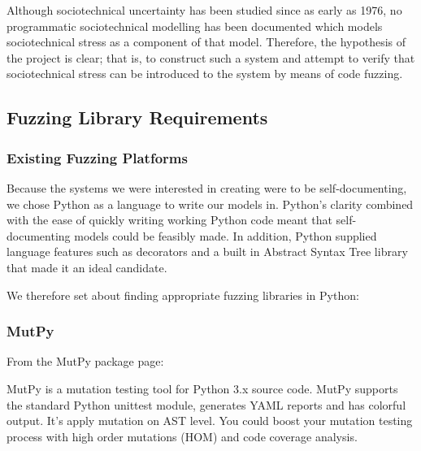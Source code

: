 \documentclass{sig-alternate}
\begin{document}
Although sociotechnical uncertainty has been studied since as early as 1976\cite{Susman1976}, no programmatic sociotechnical modelling has been documented which models sociotechnical stress as a component of that model. Therefore, the hypothesis of the project is clear; that is, to construct such a system and attempt to verify that sociotechnical stress can be introduced to the system by means of code fuzzing. \par


\subsection{Fuzzing Library Requirements}\label{planning_fuzzing}


\subsubsection{Existing Fuzzing Platforms}
\label{research_fuzzing}
Because the systems we were interested in creating were to be self-documenting, we chose Python as a language to write our models in. Python's clarity combined with the ease of quickly writing working Python code meant that self-documenting models could be feasibly made. In addition, Python supplied language features such as decorators and a built in Abstract Syntax Tree library that made it an ideal candidate. \par
We therefore set about finding appropriate fuzzing libraries in Python:

\subsubsection{MutPy} 
\label{fuzzing_mutpy}
From the MutPy package page\cite{mutpy26}: 
\begin{displayquote}
MutPy is a mutation testing tool for Python 3.x source code. MutPy supports the standard Python unittest module, generates YAML reports and has colorful output. It’s apply mutation on AST level. You could boost your mutation testing process with high order mutations (HOM) and code coverage analysis.
\end{displayquote}\par
\end{document}
